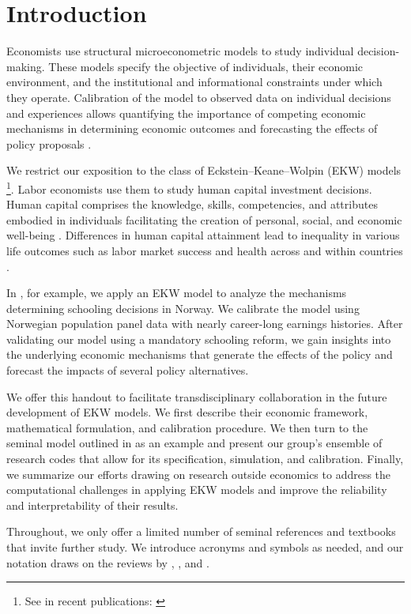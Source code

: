 \section{Introduction}
Economists use structural microeconometric models to study individual decision-making. These models specify the objective of individuals, their economic environment, and the institutional and informational constraints under which they operate. Calibration of the model to observed data on individual decisions and experiences allows quantifying the importance of competing economic mechanisms in determining economic outcomes and forecasting the effects of policy proposals \citep{Wolpin.2013}.

We restrict our exposition to the class of Eckstein--Keane--Wolpin (EKW) models \citep{Aguirregabiria.2010}\footnote{See in recent publications: \cite{Adda.2017, Blundell.2016, Keane.1997}}. Labor economists use them to study human capital investment decisions. Human capital comprises the knowledge, skills, competencies, and attributes embodied in individuals facilitating the creation of personal, social, and economic well-being \citep{Becker.1964}. Differences in human capital attainment lead to inequality in various life outcomes such as labor market success and health across and within countries \citep{OECD.2001}.

In \citet{Bhuller.2018}, for example, we apply an EKW model to analyze the mechanisms determining schooling decisions in Norway. We calibrate the model using Norwegian population panel data with nearly career-long earnings histories. After validating our model using a mandatory schooling reform, we gain insights into the underlying economic mechanisms that generate the effects of the policy and forecast the impacts of several policy alternatives.

We offer this handout to facilitate transdisciplinary collaboration in the future development of EKW models. We first describe their economic framework, mathematical formulation, and calibration procedure. We then turn to the seminal model outlined in \citet{Keane.1997} as an example and present our group's ensemble of research codes that allow for its specification, simulation, and calibration. Finally, we summarize our efforts drawing on research outside economics to address the computational challenges in applying EKW models and improve the reliability and interpretability of their results.

Throughout, we only offer a limited number of seminal references and textbooks that invite further study. We introduce acronyms and symbols as needed, and our notation draws on the reviews by \cite{Aguirregabiria.2010}, \cite{Arcidiacono.2011}, and \cite{Puterman.1994}.
